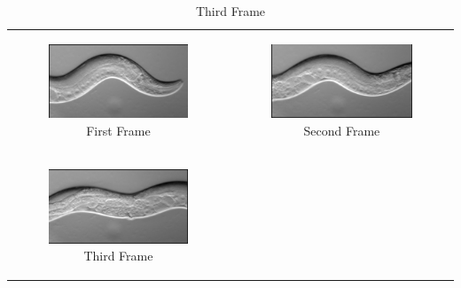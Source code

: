 \documentclass[12pt,oneside,listof=totoc,paper=a4,headings=small]{scrbook}
\begin{document}
{\centering
\begin{table}[ht]
\begin{tabular}{cc}
\begin{subfigure}{0.4\textwidth}\centering\includegraphics[width=0.75\columnwidth]{images/Caenorhabditiselegans0A1.png}\caption{First Frame}\label{fig:eleganstaba}\end{subfigure}&
\begin{subfigure}{0.4\textwidth}\centering\includegraphics[width=0.75\columnwidth]{images/Caenorhabditiselegans0A2.png}\caption{Second Frame}\label{fig:eleganstabb}\end{subfigure}\\
\newline
\begin{subfigure}{0.4\textwidth}\centering\includegraphics[width=0.75\columnwidth]{images/Caenorhabditiselegans0A3.png}\caption{Third Frame}\label{fig:eleganstabc}\end{subfigure}&

\end{tabular}
\end{table}}
\end{document}
